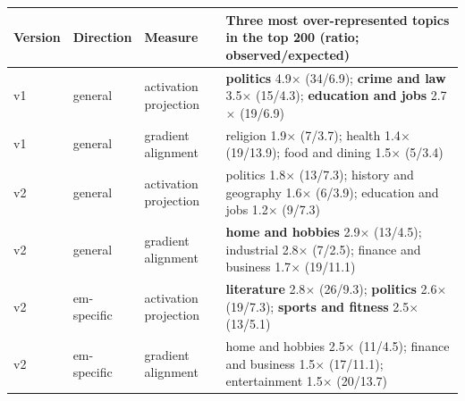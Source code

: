 \begin{tabular}{@{}lllp{8.1cm}@{}}
\toprule
Version & Direction & Measure & Three most over-represented topics in the top 200 (ratio; observed/expected) \\
\midrule
v1 & general & activation projection & \textbf{politics} 4.9$\times$ (34/6.9); \textbf{crime and law} 3.5$\times$ (15/4.3); \textbf{education and jobs} 2.7$\times$ (19/6.9) \\
v1 & general & gradient alignment & religion 1.9$\times$ (7/3.7); health 1.4$\times$ (19/13.9); food and dining 1.5$\times$ (5/3.4) \\
v2 & general & activation projection & politics 1.8$\times$ (13/7.3); history and geography 1.6$\times$ (6/3.9); education and jobs 1.2$\times$ (9/7.3) \\
v2 & general & gradient alignment & \textbf{home and hobbies} 2.9$\times$ (13/4.5); industrial 2.8$\times$ (7/2.5); finance and business 1.7$\times$ (19/11.1) \\
v2 & em-specific & activation projection & \textbf{literature} 2.8$\times$ (26/9.3); \textbf{politics} 2.6$\times$ (19/7.3); \textbf{sports and fitness} 2.5$\times$ (13/5.1) \\
v2 & em-specific & gradient alignment & home and hobbies 2.5$\times$ (11/4.5); finance and business 1.5$\times$ (17/11.1); entertainment 1.5$\times$ (20/13.7) \\
\bottomrule
\end{tabular}
